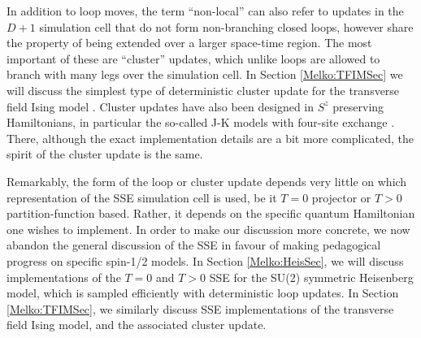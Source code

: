 \documentclass[vecphys]{svmult}
\begin{document}
In addition to loop moves, the term ``non-local'' can also refer to updates in the $D+1$ simulation cell that do not form non-branching closed loops, however share the property of being extended over a larger space-time region.  The most important of these are ``cluster'' updates,
which unlike loops are allowed to branch with many legs over the simulation cell.
In  Section \ref{Melko:TFIMSec} we will discuss the simplest type of deterministic cluster update for the transverse field Ising model \cite{Melko:Sandvik03}.  Cluster updates have also been designed in $S^z$ preserving Hamiltonians, in particular the so-called J-K models with four-site exchange \cite{Melko:JKqmc}.  There, although the exact implementation details are a bit more complicated, the spirit of the cluster update is the same.

Remarkably, the form of the loop or cluster update depends very little on which representation of the SSE simulation cell is used, be it $T=0$ projector or $T>0$ partition-function based.  Rather, it depends on the specific quantum Hamiltonian one wishes to implement.  In order to make our discussion more concrete, we now abandon the general discussion of the SSE in favour of making pedagogical progress on specific spin-1/2 models.  In Section  \ref{Melko:HeisSec}, we will discuss implementations of the $T=0$ and $T>0$ SSE for the SU(2) symmetric Heisenberg model, which is sampled efficiently with deterministic loop updates.  In Section  \ref{Melko:TFIMSec}, we similarly discuss SSE implementations of the transverse field Ising model, and the associated cluster update.



\end{document}
